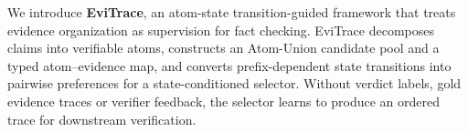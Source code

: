 \documentclass[letterpaper]{article}
\begin{document}



We introduce \textbf{EviTrace}, an atom-state transition-guided framework
that treats evidence organization as supervision for fact checking.
EviTrace decomposes claims into verifiable atoms, constructs an Atom-Union
candidate pool and a typed atom--evidence map, and converts
prefix-dependent state transitions into pairwise preferences for a
state-conditioned selector. Without verdict labels, gold evidence
traces or verifier feedback, the selector learns to
produce an ordered trace for downstream verification.
\end{document}
